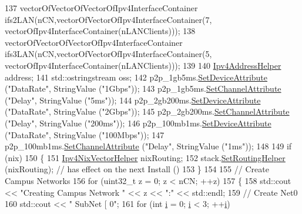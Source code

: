 \begin{DoxyCode}
137   vectorOfVectorOfVectorOfIpv4InterfaceContainer ifs2LAN(nCN,vectorOfVectorOfIpv4InterfaceContainer(7,
      vectorOfIpv4InterfaceContainer(nLANClients)));
138   vectorOfVectorOfVectorOfIpv4InterfaceContainer ifs3LAN(nCN,vectorOfVectorOfIpv4InterfaceContainer(5,
      vectorOfIpv4InterfaceContainer(nLANClients)));
139   
140   \hyperlink{classns3_1_1Ipv4AddressHelper}{Ipv4AddressHelper} address;
141   std::ostringstream oss;
142   p2p\_1gb5ms.\hyperlink{classns3_1_1PointToPointHelper_a4577f5ab8c387e5528af2e0fbab1152e}{SetDeviceAttribute} (\textcolor{stringliteral}{"DataRate"}, StringValue (\textcolor{stringliteral}{"1Gbps"}));
143   p2p\_1gb5ms.\hyperlink{classns3_1_1PointToPointHelper_a6b5317fd17fb61e5a53f8d66a90b63b9}{SetChannelAttribute} (\textcolor{stringliteral}{"Delay"}, StringValue (\textcolor{stringliteral}{"5ms"}));
144   p2p\_2gb200ms.\hyperlink{classns3_1_1PointToPointHelper_a4577f5ab8c387e5528af2e0fbab1152e}{SetDeviceAttribute} (\textcolor{stringliteral}{"DataRate"}, StringValue (\textcolor{stringliteral}{"2Gbps"}));
145   p2p\_2gb200ms.\hyperlink{classns3_1_1PointToPointHelper_a6b5317fd17fb61e5a53f8d66a90b63b9}{SetChannelAttribute} (\textcolor{stringliteral}{"Delay"}, StringValue (\textcolor{stringliteral}{"200ms"}));
146   p2p\_100mb1ms.\hyperlink{classns3_1_1PointToPointHelper_a4577f5ab8c387e5528af2e0fbab1152e}{SetDeviceAttribute} (\textcolor{stringliteral}{"DataRate"}, StringValue (\textcolor{stringliteral}{"100Mbps"}));
147   p2p\_100mb1ms.\hyperlink{classns3_1_1PointToPointHelper_a6b5317fd17fb61e5a53f8d66a90b63b9}{SetChannelAttribute} (\textcolor{stringliteral}{"Delay"}, StringValue (\textcolor{stringliteral}{"1ms"}));
148 
149   \textcolor{keywordflow}{if} (nix)
150     \{
151       \hyperlink{classns3_1_1Ipv4NixVectorHelper}{Ipv4NixVectorHelper} nixRouting;
152       stack.\hyperlink{classns3_1_1InternetStackHelper_a3e382c02df022dec79952a7eca8cd5ba}{SetRoutingHelper} (nixRouting); \textcolor{comment}{// has effect on the next Install ()}
153     \}
154 
155   \textcolor{comment}{// Create Campus Networks}
156   \textcolor{keywordflow}{for} (uint32\_t z = 0; z < nCN; ++z)
157     \{
158       std::cout << \textcolor{stringliteral}{"Creating Campus Network "} << z << \textcolor{stringliteral}{":"} << std::endl;
159       \textcolor{comment}{// Create Net0}
160       std::cout << \textcolor{stringliteral}{"  SubNet [ 0"};
161       \textcolor{keywordflow}{for} (\textcolor{keywordtype}{int} \hyperlink{bernuolliDistribution_8m_a6f6ccfcf58b31cb6412107d9d5281426}{i} = 0; \hyperlink{bernuolliDistribution_8m_a6f6ccfcf58b31cb6412107d9d5281426}{i} < 3; ++\hyperlink{bernuolliDistribution_8m_a6f6ccfcf58b31cb6412107d9d5281426}{i})

\end{DoxyCode}
